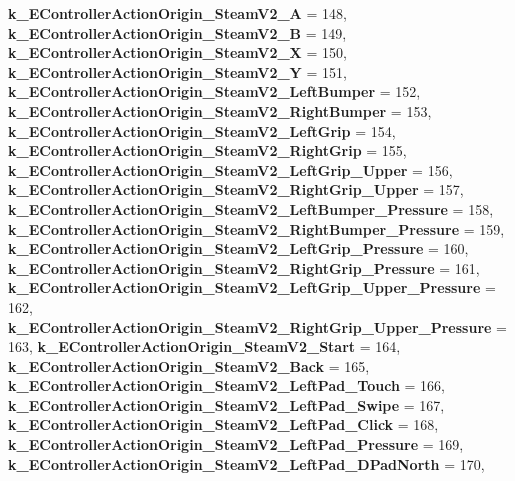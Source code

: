 \begin{DoxyCompactItemize}
\newline
{\bfseries k\+\_\+\+E\+Controller\+Action\+Origin\+\_\+\+Steam\+V2\+\_\+A} = 148, 
{\bfseries k\+\_\+\+E\+Controller\+Action\+Origin\+\_\+\+Steam\+V2\+\_\+B} = 149, 
{\bfseries k\+\_\+\+E\+Controller\+Action\+Origin\+\_\+\+Steam\+V2\+\_\+X} = 150, 
{\bfseries k\+\_\+\+E\+Controller\+Action\+Origin\+\_\+\+Steam\+V2\+\_\+Y} = 151, 
\newline
{\bfseries k\+\_\+\+E\+Controller\+Action\+Origin\+\_\+\+Steam\+V2\+\_\+\+Left\+Bumper} = 152, 
{\bfseries k\+\_\+\+E\+Controller\+Action\+Origin\+\_\+\+Steam\+V2\+\_\+\+Right\+Bumper} = 153, 
{\bfseries k\+\_\+\+E\+Controller\+Action\+Origin\+\_\+\+Steam\+V2\+\_\+\+Left\+Grip} = 154, 
{\bfseries k\+\_\+\+E\+Controller\+Action\+Origin\+\_\+\+Steam\+V2\+\_\+\+Right\+Grip} = 155, 
\newline
{\bfseries k\+\_\+\+E\+Controller\+Action\+Origin\+\_\+\+Steam\+V2\+\_\+\+Left\+Grip\+\_\+\+Upper} = 156, 
{\bfseries k\+\_\+\+E\+Controller\+Action\+Origin\+\_\+\+Steam\+V2\+\_\+\+Right\+Grip\+\_\+\+Upper} = 157, 
{\bfseries k\+\_\+\+E\+Controller\+Action\+Origin\+\_\+\+Steam\+V2\+\_\+\+Left\+Bumper\+\_\+\+Pressure} = 158, 
{\bfseries k\+\_\+\+E\+Controller\+Action\+Origin\+\_\+\+Steam\+V2\+\_\+\+Right\+Bumper\+\_\+\+Pressure} = 159, 
\newline
{\bfseries k\+\_\+\+E\+Controller\+Action\+Origin\+\_\+\+Steam\+V2\+\_\+\+Left\+Grip\+\_\+\+Pressure} = 160, 
{\bfseries k\+\_\+\+E\+Controller\+Action\+Origin\+\_\+\+Steam\+V2\+\_\+\+Right\+Grip\+\_\+\+Pressure} = 161, 
{\bfseries k\+\_\+\+E\+Controller\+Action\+Origin\+\_\+\+Steam\+V2\+\_\+\+Left\+Grip\+\_\+\+Upper\+\_\+\+Pressure} = 162, 
{\bfseries k\+\_\+\+E\+Controller\+Action\+Origin\+\_\+\+Steam\+V2\+\_\+\+Right\+Grip\+\_\+\+Upper\+\_\+\+Pressure} = 163, 
\newline
{\bfseries k\+\_\+\+E\+Controller\+Action\+Origin\+\_\+\+Steam\+V2\+\_\+\+Start} = 164, 
{\bfseries k\+\_\+\+E\+Controller\+Action\+Origin\+\_\+\+Steam\+V2\+\_\+\+Back} = 165, 
{\bfseries k\+\_\+\+E\+Controller\+Action\+Origin\+\_\+\+Steam\+V2\+\_\+\+Left\+Pad\+\_\+\+Touch} = 166, 
{\bfseries k\+\_\+\+E\+Controller\+Action\+Origin\+\_\+\+Steam\+V2\+\_\+\+Left\+Pad\+\_\+\+Swipe} = 167, 
\newline
{\bfseries k\+\_\+\+E\+Controller\+Action\+Origin\+\_\+\+Steam\+V2\+\_\+\+Left\+Pad\+\_\+\+Click} = 168, 
{\bfseries k\+\_\+\+E\+Controller\+Action\+Origin\+\_\+\+Steam\+V2\+\_\+\+Left\+Pad\+\_\+\+Pressure} = 169, 
{\bfseries k\+\_\+\+E\+Controller\+Action\+Origin\+\_\+\+Steam\+V2\+\_\+\+Left\+Pad\+\_\+\+D\+Pad\+North} = 170, 

\end{DoxyCompactItemize}
